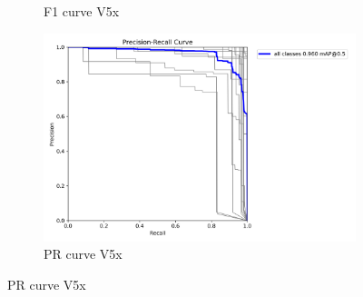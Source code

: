 \documentclass[letterpaper,11pt]{report}
\begin{document}
\begin{figure}[h!]
\begin{subfigure}[t]{0.4\textwidth}
        \caption{F1 curve V5x}
        \label{fig:image3}
    \end{subfigure}
    \hfill
    \begin{subfigure}[t]{0.4\textwidth}
        \centering
        \includegraphics[width=\textwidth]{PR_curve-v5x.png}
        \caption{PR curve V5x}
        \label{fig:image4}
    \end{subfigure}
    
    \vspace{0.5cm}
    

\end{figure}
\end{document}
